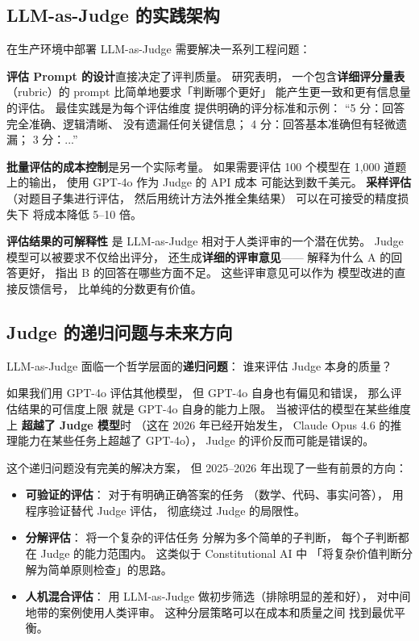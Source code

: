 \subsection{LLM-as-Judge 的实践架构}

在生产环境中部署 LLM-as-Judge
需要解决一系列工程问题：

\textbf{评估 Prompt 的设计}直接决定了评判质量。
研究表明，
一个包含\textbf{详细评分量表}（rubric）的 prompt
比简单地要求「判断哪个更好」
能产生更一致和更有信息量的评估。
最佳实践是为每个评估维度
提供明确的评分标准和示例：
“5 分：回答完全准确、逻辑清晰、
没有遗漏任何关键信息；
4 分：回答基本准确但有轻微遗漏；
3 分：...”

\textbf{批量评估的成本控制}是另一个实际考量。
如果需要评估 100 个模型在 1,000 道题上的输出，
使用 GPT-4o 作为 Judge 的 API 成本
可能达到数千美元。
\textbf{采样评估}（对题目子集进行评估，
然后用统计方法外推全集结果）
可以在可接受的精度损失下
将成本降低 5--10 倍。

\textbf{评估结果的可解释性}
是 LLM-as-Judge 相对于人类评审的一个潜在优势。
Judge 模型可以被要求不仅给出评分，
还生成\textbf{详细的评审意见}——
解释为什么 A 的回答更好，
指出 B 的回答在哪些方面不足。
这些评审意见可以作为
模型改进的直接反馈信号，
比单纯的分数更有价值。

\subsection{Judge 的递归问题与未来方向}

LLM-as-Judge 面临一个哲学层面的\textbf{递归问题}：
谁来评估 Judge 本身的质量？

如果我们用 GPT-4o 评估其他模型，
但 GPT-4o 自身也有偏见和错误，
那么评估结果的可信度上限
就是 GPT-4o 自身的能力上限。
当被评估的模型在某些维度上
\textbf{超越了 Judge 模型}时
（这在 2026 年已经开始发生，
Claude Opus 4.6 的推理能力在某些任务上超越了 GPT-4o），
Judge 的评价反而可能是错误的。

这个递归问题没有完美的解决方案，
但 2025--2026 年出现了一些有前景的方向：
\begin{itemize}[noitemsep]
  \item \textbf{可验证的评估}：
        对于有明确正确答案的任务
        （数学、代码、事实问答），
        用程序验证替代 Judge 评估，
        彻底绕过 Judge 的局限性。
  \item \textbf{分解评估}：
        将一个复杂的评估任务
        分解为多个简单的子判断，
        每个子判断都在 Judge 的能力范围内。
        这类似于 Constitutional AI 中
        「将复杂价值判断分解为简单原则检查」的思路。
  \item \textbf{人机混合评估}：
        用 LLM-as-Judge 做初步筛选（排除明显的差和好），
        对中间地带的案例使用人类评审。
        这种分层策略可以在成本和质量之间
        找到最优平衡。
\end{itemize}

